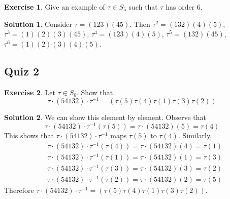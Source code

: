 \documentclass[12pt]{article}
\theoremstyle{definition}
\newtheorem{exercise}{\color{YellowOrange}Exercise}
\theoremstyle{definition}
\newtheorem{solution}{\color{Goldenrod}Solution}
\begin{document}
\begin{exercise}
Give an example of $\tau \in S_5$ such that $\tau$ has order 6. 
\end{exercise}
\begin{solution}
Consider $\tau = (123)(45)$. Then $\tau^2 = (132)(4)(5)$, $\tau^3 = (1)(2)(3)(45)$, $\tau^4 = (123)(4)(5)$, $\tau^5 = (132)(45)$, $\tau^6 = (1)(2)(3)(4)(5)$.
\end{solution}

\subsection{Quiz 2}
\begin{exercise}
Let $\tau \in S_6$. Show that
\begin{equation*}
\tau \cdot (5 4 1 3 2) \cdot \tau^{-1} = (\tau(5) \tau(4) \tau(1) \tau(3) \tau(2))
\end{equation*}
\end{exercise}

\begin{solution}
We can show this element by element. Observe that
\begin{equation}
	\tau \cdot (54132) \cdot \tau^{-1}(\tau(5)) = \tau \cdot (54132)(5) = \tau(4)
\end{equation}
This shows that $\tau \cdot (54132) \cdot \tau^{-1}$ maps $\tau(5)$ to $\tau(4)$. Similarly,
\begin{align}
&\tau \cdot (54132) \cdot \tau^{-1}(\tau(4)) = \tau \cdot (54132)(4) = \tau(1) \\
&\tau \cdot (54132) \cdot \tau^{-1}(\tau(1)) = \tau \cdot (54132)(1) = \tau(3) \\
&\tau \cdot (54132) \cdot \tau^{-1}(\tau(3)) = \tau \cdot (54132)(3) = \tau(2) \\
&\tau \cdot (54132) \cdot \tau^{-1}(\tau(2)) = \tau \cdot (54132)(2) = \tau(5) 
\end{align}
Therefore $\tau \cdot (5 4 1 3 2) \cdot \tau^{-1} = (\tau(5) \tau(4) \tau(1) \tau(3) \tau(2))
$.
\end{solution}		
\end{document}
